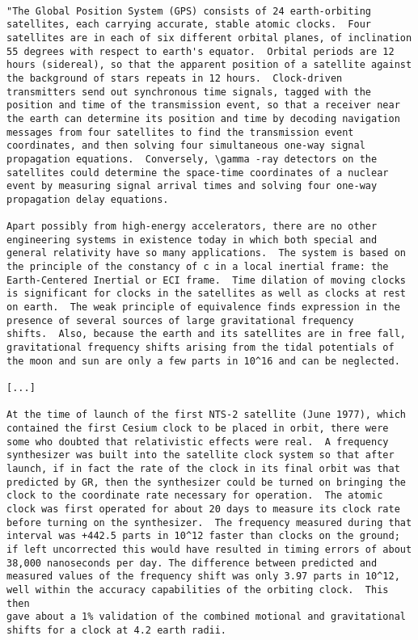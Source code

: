 \begin{verbatim}

"The Global Position System (GPS) consists of 24 earth-orbiting
satellites, each carrying accurate, stable atomic clocks.  Four
satellites are in each of six different orbital planes, of inclination
55 degrees with respect to earth's equator.  Orbital periods are 12
hours (sidereal), so that the apparent position of a satellite against
the background of stars repeats in 12 hours.  Clock-driven
transmitters send out synchronous time signals, tagged with the
position and time of the transmission event, so that a receiver near
the earth can determine its position and time by decoding navigation
messages from four satellites to find the transmission event
coordinates, and then solving four simultaneous one-way signal
propagation equations.  Conversely, \gamma -ray detectors on the
satellites could determine the space-time coordinates of a nuclear
event by measuring signal arrival times and solving four one-way
propagation delay equations.

Apart possibly from high-energy accelerators, there are no other
engineering systems in existence today in which both special and
general relativity have so many applications.  The system is based on
the principle of the constancy of c in a local inertial frame: the
Earth-Centered Inertial or ECI frame.  Time dilation of moving clocks
is significant for clocks in the satellites as well as clocks at rest
on earth.  The weak principle of equivalence finds expression in the
presence of several sources of large gravitational frequency
shifts.  Also, because the earth and its satellites are in free fall,
gravitational frequency shifts arising from the tidal potentials of
the moon and sun are only a few parts in 10^16 and can be neglected.

[...]

At the time of launch of the first NTS-2 satellite (June 1977), which
contained the first Cesium clock to be placed in orbit, there were
some who doubted that relativistic effects were real.  A frequency
synthesizer was built into the satellite clock system so that after
launch, if in fact the rate of the clock in its final orbit was that
predicted by GR, then the synthesizer could be turned on bringing the
clock to the coordinate rate necessary for operation.  The atomic
clock was first operated for about 20 days to measure its clock rate
before turning on the synthesizer.  The frequency measured during that
interval was +442.5 parts in 10^12 faster than clocks on the ground;
if left uncorrected this would have resulted in timing errors of about
38,000 nanoseconds per day. The difference between predicted and
measured values of the frequency shift was only 3.97 parts in 10^12,
well within the accuracy capabilities of the orbiting clock.  This then
gave about a 1% validation of the combined motional and gravitational
shifts for a clock at 4.2 earth radii.


\end{verbatim}
